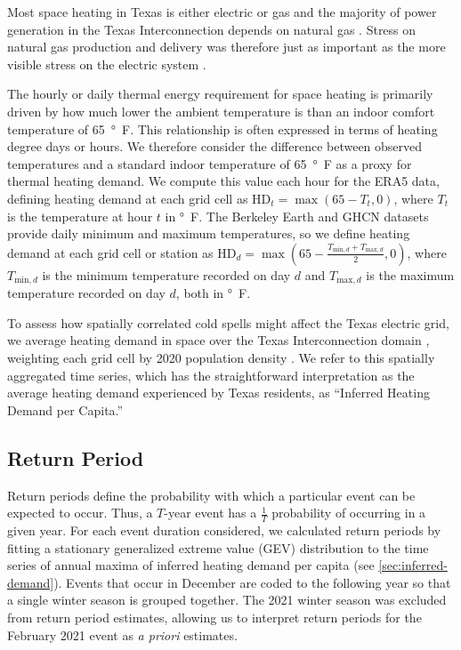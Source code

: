 \documentclass[12pt]{iopart}
\begin{document}
Most space heating in Texas is either electric or gas \cite{waite_heating:2020} and the majority of power generation in the Texas Interconnection depends on natural gas \cite{everhart_iea:2021}.
Stress on natural gas production and delivery was therefore just as important as the more visible stress on the electric system \cite{ercotpublic_outagesv2:2021}.

The hourly or daily thermal energy requirement for space heating is primarily driven by how much lower the ambient temperature is than an indoor comfort temperature of \SI{65}{\degree F}.
This relationship is often expressed in terms of heating degree days or hours.
We therefore consider the difference between observed temperatures and a standard indoor temperature of \SI{65}{\degree F} as a proxy for thermal heating demand.
We compute this value each hour for the ERA5 data, defining heating demand at each grid cell as $\text{HD}_t = \max (65 - T_t, 0)$, where $T_t$ is the temperature at hour $t$ in \si{\degree F}.
The Berkeley Earth and GHCN datasets provide daily minimum and maximum temperatures, so we define heating demand at each grid cell or station as $\text{HD}_d = \max (65 -\frac{T_{\text{min},d} + T_{\text{max},d}}{2}, 0)$, where $T_{\text{min},d}$ is the minimum temperature recorded on day $d$ and $T_{\text{max},d}$ is the maximum temperature recorded on day $d$, both in \si{\degree F}.

To assess how spatially correlated cold spells might affect the Texas electric grid, we average heating demand in space over the Texas Interconnection domain \cite{useia_regions:2021}, weighting each grid cell by 2020 population density \cite{ciesin_gpwv4:2016}.
We refer to this spatially aggregated time series, which has the straightforward interpretation as the average heating demand experienced by Texas residents, as ``Inferred Heating Demand per Capita.''

\subsection{Return Period}

Return periods define the probability with which a particular event can be expected to occur.
Thus, a $T$-year event has a $\frac{1}{T}$ probability of occurring in a given year.
For each event duration considered, we calculated return periods by fitting a stationary generalized extreme value (GEV) distribution to the time series of annual maxima of inferred heating demand per capita (see \cref{sec:inferred-demand}).
Events that occur in December are coded to the following year so that a single winter season is grouped together.
The 2021 winter season was excluded from return period estimates, allowing us to interpret return periods for the February 2021 event as \emph{a priori} estimates.
\end{document}
